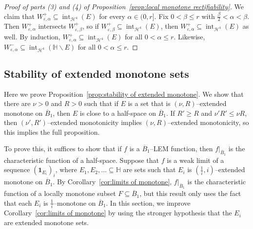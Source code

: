 \documentclass[11pt,reqno]{amsart}
\renewcommand{\H}{\mathbb{H}}
\newcommand{\cH}{\mathcal{H}}
\renewcommand{\epsilon}{\varepsilon}
\newcommand{\0}{\mathbf{0}}
\renewcommand{\1}{\mathbf 1}
\newcommand{\one}{\mathbf{1}}
\renewcommand{\subset}{\subseteq}
\renewcommand{\ge}{\geqslant}
\renewcommand{\le}{\leqslant}
\renewcommand{\setminus}{\smallsetminus}
\theoremstyle{remark}
\DeclareMathOperator{\inter}{int}
\begin{document}
\begin{proof}[{Proof of parts (3) and (4) of Proposition~\ref{prop:local monotone rectifiability}}]
  We claim that $W^+_{\epsilon,\alpha}\subset \inter_{\cH^4} (E)$ for every $\alpha\in (0,r]$.  Fix $0<\beta\le r$ with $\frac{\beta}{2}<\alpha<\beta$.  Then $W^+_{\epsilon,\alpha}$ intersects $W^+_{\epsilon,\beta}$, so if $W^+_{\epsilon,\beta}\subset \inter_{\cH^4} (E)$, then $W^+_{\epsilon,\alpha}\subset \inter_{\cH^4} (E)$ as well.  By induction, $W^+_{\epsilon,\alpha}\subset \inter_{\cH^4} (E)$ for all $0<\alpha\le r$.  Likewise, $W^-_{\epsilon,\alpha}\subset \inter_{\cH^4} (\H\setminus E)$ for all $0<\alpha\le r$.
\end{proof}

\subsection{Stability of extended monotone sets}\label{sec:stability of extended monotone sets}

Here we prove Proposition~\ref{prop:stability of extended monotone}.  We show that there are $\nu>0$ and $R>0$ such that if $E$ is a set that is $(\nu,R)$--extended monotone on $\overline{B}_1$, then $E$ is close to a half-space on $\overline{B}_1$.  If $R' \ge R$ and $\nu' R'\le \nu R$, then $(\nu',R')$--extended monotonicity implies $(\nu, R)$--extended monotonicity, so this implies the full proposition.

To prove this, it suffices to show that if $f$ is a $\overline{B}_1$--LEM function, then $f|_{\overline{B}_1}$ is the characteristic function of a half-space.  Suppose that $f$ is a weak limit of a sequence $(\one_{E_i})_i$, where $E_1,E_2,\dots\subset \H$ are sets such that $E_i$ is $(\frac{1}{i},i)$--extended monotone on $\overline{B}_1$.  By Corollary~\ref{cor:limits of monotone}, $f|_{\overline{B}_1}$ is the characteristic function of a locally monotone subset $F\subset \overline{B}_1$, but this result only uses the fact that each $E_i$ is $\frac{1}{i}$--monotone on $\overline{B}_1$.  In this section, we  improve Corollary~\ref{cor:limits of monotone} by using the stronger hypothesis that  the $E_i$ are extended monotone sets.
\end{document}
